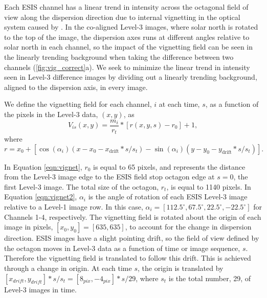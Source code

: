   
        Each ESIS channel has a linear trend in intensity across the octagonal field of view along the dispersion direction due to internal vignetting in the optical system caused by  \citep{ESIS}.
        In the co-aligned Level-3 images, where solar north is rotated to the top of the image, the dispersion axes runs at different angles relative to solar north in each channel, so the impact of the vignetting field can be seen in the linearly trending background when taking the difference between two channels (\Figure \ref{fig:vig_correct}a).
        We seek to minimize the linear trend in intensity seen in Level-3 difference images by dividing out a linearly trending background, aligned to the dispersion axis, in every image.
        
        We define the vignetting field for each channel, $i$ at each time, $s$, as a function of the pixels in the Level-3 data, $(x,y)$, as 
        \begin{equation}
            V_{is}(x,y) = \frac{m_{i}}{r_t} * [r(x,y,s) - r_0] + 1,
            \label{eqn:vignet}
        \end{equation}
       	where
       	\begin{equation}
       		r = x_0 + [\cos(\alpha_i)(x-x_0-x_{\text{drift}}*s/s_t) - \sin(\alpha_i)(y-y_0-y_{\text{drift}}*s/s_t)].
        	\label{eqn:vignet2}
       	\end{equation}
        
        In Equation \ref{eqn:vignet}, $r_0$ is equal to 65 pixels, and represents the distance from the Level-3 image edge to the ESIS field stop octagon edge at $s = 0$, the first Level-3 image.
        The total size of the octagon, $r_t$, is equal to 1140 pixels.
        In Equation \ref{eqn:vignet2},  $\alpha_i$ is the angle of rotation of each ESIS Level-3 image relative to a Level-1 image row.
        In this case, $\alpha_i = [112.5^{\circ}, 67.5^{\circ}, 22.5^{\circ}, -22.5^{\circ}]$ for Channels 1-4, respectively.
        The vignetting field is rotated about the origin of each image in pixels, $[x_0, y_0] = [635,635]$, to account for the change in dispersion direction.
        ESIS images have a slight pointing drift, so the field of view defined by the octagon moves in Level-3 data as a function of time or image sequence, $s$.
        Therefore the vignetting field is translated to follow this drift.
        This is achieved through a change in origin.
        At each time $s$, the origin is translated by $[x_{drift},y_{drift}]*s/s_t = [8_{pix},-4_{pix}]*s/29$, where $s_t $ is the total number, 29, of Level-3 images in time. 
        
